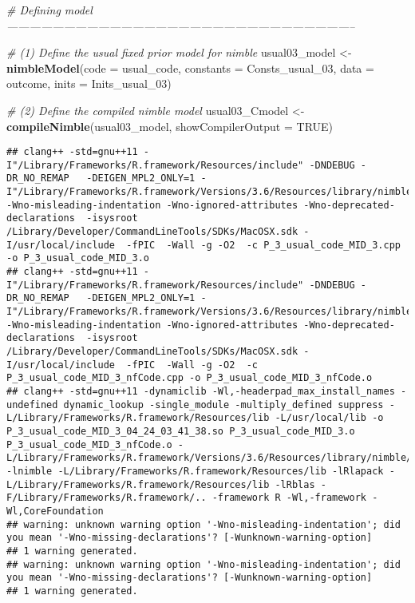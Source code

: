 \documentclass[]{article}
\newenvironment{Shaded}{\begin{snugshade}}{\end{snugshade}}
\newcommand{\CommentTok}[1]{\textcolor[rgb]{0.56,0.35,0.01}{\textit{#1}}}
\newcommand{\DataTypeTok}[1]{\textcolor[rgb]{0.13,0.29,0.53}{#1}}
\newcommand{\DecValTok}[1]{\textcolor[rgb]{0.00,0.00,0.81}{#1}}
\newcommand{\KeywordTok}[1]{\textcolor[rgb]{0.13,0.29,0.53}{\textbf{#1}}}
\newcommand{\NormalTok}[1]{#1}
\newcommand{\OtherTok}[1]{\textcolor[rgb]{0.56,0.35,0.01}{#1}}
\newcommand{\StringTok}[1]{\textcolor[rgb]{0.31,0.60,0.02}{#1}}
\begin{document}
\begin{Shaded}
\begin{Highlighting}[]
\CommentTok{# Defining model --------------------------------------------------------------------------------------------}

\CommentTok{# (1) Define the usual fixed prior model for nimble}
\NormalTok{usual03_model <-}\StringTok{ }\KeywordTok{nimbleModel}\NormalTok{(}\DataTypeTok{code =}\NormalTok{ usual_code, }\DataTypeTok{constants =}\NormalTok{ Consts_usual_}\DecValTok{03}\NormalTok{, }\DataTypeTok{data =}\NormalTok{ outcome, }\DataTypeTok{inits =}\NormalTok{ Inits_usual_}\DecValTok{03}\NormalTok{)}

\CommentTok{# (2) Define the compiled nimble model}
\NormalTok{usual03_Cmodel <-}\StringTok{ }\KeywordTok{compileNimble}\NormalTok{(usual03_model, }\DataTypeTok{showCompilerOutput =} \OtherTok{TRUE}\NormalTok{)      }
\end{Highlighting}
\end{Shaded}

\begin{verbatim}
## clang++ -std=gnu++11 -I"/Library/Frameworks/R.framework/Resources/include" -DNDEBUG -DR_NO_REMAP   -DEIGEN_MPL2_ONLY=1 -I"/Library/Frameworks/R.framework/Versions/3.6/Resources/library/nimble/include" -Wno-misleading-indentation -Wno-ignored-attributes -Wno-deprecated-declarations  -isysroot /Library/Developer/CommandLineTools/SDKs/MacOSX.sdk -I/usr/local/include  -fPIC  -Wall -g -O2  -c P_3_usual_code_MID_3.cpp -o P_3_usual_code_MID_3.o
## clang++ -std=gnu++11 -I"/Library/Frameworks/R.framework/Resources/include" -DNDEBUG -DR_NO_REMAP   -DEIGEN_MPL2_ONLY=1 -I"/Library/Frameworks/R.framework/Versions/3.6/Resources/library/nimble/include" -Wno-misleading-indentation -Wno-ignored-attributes -Wno-deprecated-declarations  -isysroot /Library/Developer/CommandLineTools/SDKs/MacOSX.sdk -I/usr/local/include  -fPIC  -Wall -g -O2  -c P_3_usual_code_MID_3_nfCode.cpp -o P_3_usual_code_MID_3_nfCode.o
## clang++ -std=gnu++11 -dynamiclib -Wl,-headerpad_max_install_names -undefined dynamic_lookup -single_module -multiply_defined suppress -L/Library/Frameworks/R.framework/Resources/lib -L/usr/local/lib -o P_3_usual_code_MID_3_04_24_03_41_38.so P_3_usual_code_MID_3.o P_3_usual_code_MID_3_nfCode.o -L/Library/Frameworks/R.framework/Versions/3.6/Resources/library/nimble/CppCode -lnimble -L/Library/Frameworks/R.framework/Resources/lib -lRlapack -L/Library/Frameworks/R.framework/Resources/lib -lRblas -F/Library/Frameworks/R.framework/.. -framework R -Wl,-framework -Wl,CoreFoundation
## warning: unknown warning option '-Wno-misleading-indentation'; did you mean '-Wno-missing-declarations'? [-Wunknown-warning-option]
## 1 warning generated.
## warning: unknown warning option '-Wno-misleading-indentation'; did you mean '-Wno-missing-declarations'? [-Wunknown-warning-option]
## 1 warning generated.
\end{verbatim}
\end{document}
